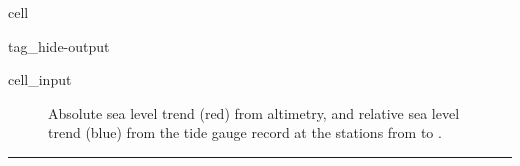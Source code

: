 \documentclass[letterpaper,10pt,english]{jupyterBook}
\begin{document}
\begin{sphinxuseclass}{cell}
\begin{sphinxuseclass}{tag_hide-output}
\begin{sphinxVerbatimInput}
\begin{sphinxuseclass}{cell_input}
\begin{sphinxVerbatim}[commandchars=\\\{\}]
  

    
  
\end{sphinxVerbatim}

\end{sphinxuseclass}\end{sphinxVerbatimInput}

\end{sphinxuseclass}
\end{sphinxuseclass}
\begin{figure}[htbp]
\centering
\capstart

\noindent{}
\caption{Absolute sea level trend (red) from altimetry, and relative sea level trend (blue) from the tide gauge record at the  stations from  to .}\label{\detokenize{notebooks/regional_and_local/SL_Trend:trend-fig}}\end{figure}


\bigskip\hrule\bigskip
\end{document}
